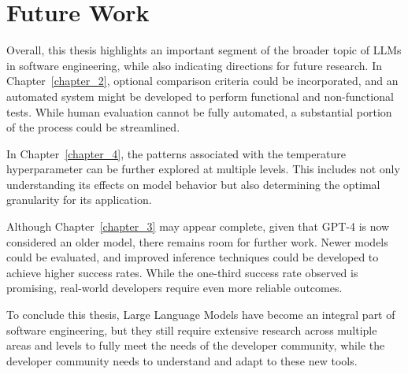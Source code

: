 \chapter{Future Work}
\label{chapter:futurework}

Overall, this thesis highlights an important segment of the broader topic of LLMs in software engineering, while also indicating directions for future research.
In Chapter~\ref{chapter_2}, optional comparison criteria could be incorporated, and an automated system might be developed to perform functional and non-functional tests.
While human evaluation cannot be fully automated, a substantial portion of the process could be streamlined.

In Chapter~\ref{chapter_4}, the patterns associated with the temperature hyperparameter can be further explored at multiple levels.
This includes not only understanding its effects on model behavior but also determining the optimal granularity for its application.

Although Chapter~\ref{chapter_3} may appear complete, given that GPT-4 is now considered an older model, there remains room for further work.
Newer models could be evaluated, and improved inference techniques could be developed to achieve higher success rates.
While the one-third success rate observed is promising, real-world developers require even more reliable outcomes.

\vspace{5em}
To conclude this thesis, Large Language Models have become an integral part of software engineering, but they still require extensive research across multiple areas and levels to fully meet the needs of the developer community, while the developer community needs to understand and adapt to these new tools.

